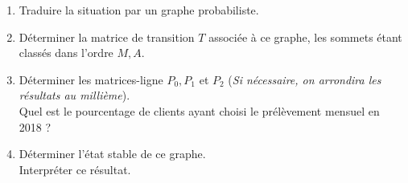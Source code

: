 \par
%
%
\par
\begin{enumerate}
     \item %
     Traduire la situation par un graphe probabiliste.
     \item %
     Déterminer la matrice de transition $T$ associée à ce graphe, les sommets étant classés dans l'ordre $M, A$.
     \item %
     Déterminer les matrices-ligne $P_0, P_1$ et $P_2$ (\textit{Si nécessaire, on arrondira les résultats au millième}).\\
     Quel est le pourcentage de clients ayant choisi le prélèvement mensuel en 2018 ?
     \item %
     Déterminer l'état stable de ce graphe. \\
     Interpréter ce résultat.
     \par
\end{enumerate}
\par
%
%
\par
